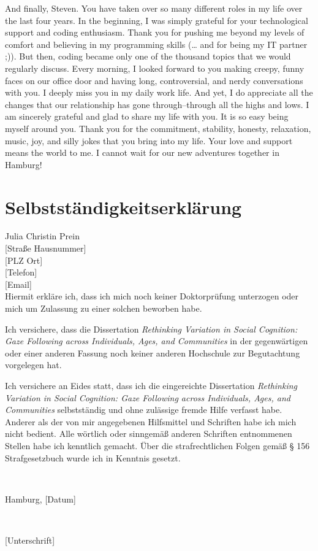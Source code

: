 \documentclass[
]{scrbook}
\begin{document}
And finally, Steven. You have taken over so many different roles in my life over the last four years. In the beginning, I was simply grateful for your technological support and coding enthusiasm. Thank you for pushing me beyond my levels of comfort and believing in my programming skills (\ldots{} and for being my IT partner ;)). But then, coding became only one of the thousand topics that we would regularly discuss. Every morning, I looked forward to you making creepy, funny faces on our office door and having long, controversial, and nerdy conversations with you. I deeply miss you in my daily work life. And yet, I do appreciate all the changes that our relationship has gone through\thinspace --\thinspace through all the highs and lows. I am sincerely grateful and glad to share my life with you. It is so easy being myself around you. Thank you for the commitment, stability, honesty, relaxation, music, joy, and silly jokes that you bring into my life. Your love and support means the world to me. I cannot wait for our new adventures together in Hamburg!

\chapter*{Selbstständigkeitserklärung}\label{selbststaendigkeit}

Julia Christin Prein\\
{[}Straße Hausnummer{]}\\
{[}PLZ Ort{]}\\
{[}Telefon{]}\\
{[}Email{]}\\

Hiermit erkläre ich, dass ich mich noch keiner Doktorprüfung unterzogen oder mich um Zulassung zu einer solchen beworben habe.

Ich versichere, dass die Dissertation \emph{Rethinking Variation in Social Cognition: Gaze Following across Individuals, Ages, and Communities} in der gegenwärtigen oder einer anderen Fassung noch keiner anderen Hochschule zur Begutachtung vorgelegen hat.

Ich versichere an Eides statt, dass ich die eingereichte Dissertation \emph{Rethinking Variation in Social Cognition: Gaze Following across Individuals, Ages, and Communities} selbstständig und ohne zulässige fremde Hilfe verfasst habe. Anderer als der von mir angegebenen Hilfsmittel und Schriften habe ich mich nicht bedient. Alle wörtlich oder sinngemäß anderen Schriften entnommenen Stellen habe ich kenntlich gemacht. Über die strafrechtlichen Folgen gemäß § 156 Strafgesetzbuch wurde ich in Kenntnis gesetzt.

~

Hamburg, {[}Datum{]}

~

{[}Unterschrift{]}
\end{document}
